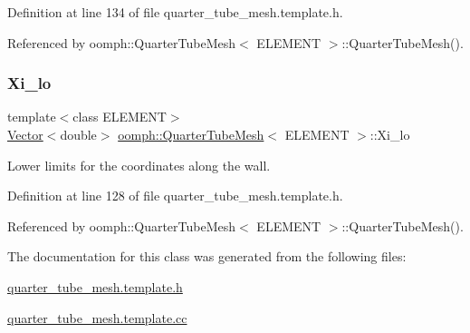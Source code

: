 Definition at line 134 of file quarter\+\_\+tube\+\_\+mesh.\+template.\+h.



Referenced by oomph\+::\+Quarter\+Tube\+Mesh$<$ E\+L\+E\+M\+E\+N\+T $>$\+::\+Quarter\+Tube\+Mesh().

\mbox{\label{classoomph_1_1QuarterTubeMesh_a323243990ecc860e5083d205c1ab247c}} 
\subsubsection{\texorpdfstring{Xi\+\_\+lo}{Xi\_lo}}
{\footnotesize\ttfamily template$<$class E\+L\+E\+M\+E\+NT$>$ \\
\hyperlink{classoomph_1_1Vector}{Vector}$<$double$>$ \hyperlink{classoomph_1_1QuarterTubeMesh}{oomph\+::\+Quarter\+Tube\+Mesh}$<$ E\+L\+E\+M\+E\+NT $>$\+::Xi\+\_\+lo\hspace{0.3cm}{\ttfamily [protected]}}



Lower limits for the coordinates along the wall. 



Definition at line 128 of file quarter\+\_\+tube\+\_\+mesh.\+template.\+h.



Referenced by oomph\+::\+Quarter\+Tube\+Mesh$<$ E\+L\+E\+M\+E\+N\+T $>$\+::\+Quarter\+Tube\+Mesh().



The documentation for this class was generated from the following files\+:\begin{DoxyCompactItemize}
\item 
\hyperlink{quarter__tube__mesh_8template_8h}{quarter\+\_\+tube\+\_\+mesh.\+template.\+h}\item 
\hyperlink{quarter__tube__mesh_8template_8cc}{quarter\+\_\+tube\+\_\+mesh.\+template.\+cc}\end{DoxyCompactItemize}
